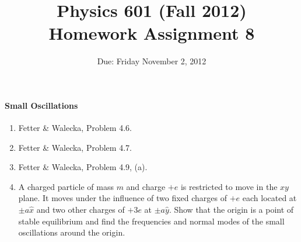 \documentclass[letterpaper,11pt]{article}
\title{Physics 601 (Fall 2012) \\ Homework Assignment 8}
\date{Due: Friday November 2, 2012}
\begin{document}
\maketitle

\paragraph*{Small Oscillations}
\begin{enumerate}
 \item Fetter \& Walecka, Problem 4.6.
 \item Fetter \& Walecka, Problem 4.7.
 \item Fetter \& Walecka, Problem 4.9, (a).
 \item A charged particle of mass $m$ and charge $+e$ is restricted to move in the $xy$ plane.  It moves under the influence of two fixed charges of $+e$ each located at $\pm a \hat{x}$ and two other charges of $+3e$ at $\pm a \hat{y}$.  Show that the origin is a point of stable equilibrium and find the frequencies and normal modes of the small oscillations around the origin.
\end{enumerate}
\end{document}
